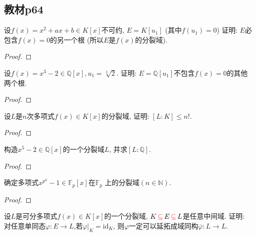 \subsection{教材p64}

\begin{problem}
    设$f(x) = x^2 + ax + b \in K[x]$不可约, $E = K[u_1]$
(其中$f(u_1) = 0$) 证明: $E$必包含$f(x) = 0$的另一个根
(所以$E$是$f(x)$的分裂域).
\end{problem}

\begin{proof}
    
\end{proof}

\begin{problem}
    设$f(x) = x^3 - 2 \in \mathbb{Q}[x], u_1 = \sqrt[3]{2}$.
证明: $E = \mathbb{Q}[u_1]$不包含$f(x) = 0$的其他两个根.
\end{problem}

\begin{proof}
    
\end{proof}

\begin{problem}
    设$L$是$n$次多项式$f(x) \in K[x]$的分裂域, 证明: 
$[L:K] \leqslant n!$.
\end{problem}

\begin{proof}
    
\end{proof}

\begin{problem}
    构造$x^5 - 2 \in \mathbb{Q}[x]$的一个分裂域$L$,
并求$[L:\mathbb{Q}]$.
\end{problem}

\begin{proof}
    
\end{proof}

\begin{problem}
    确定多项式$x^{p^n} - 1 \in \mathbb{F}_p[x]$在$\mathbb{F}_p$
上的分裂域$(n \in \mathbb{N})$.
\end{problem}

\begin{proof}
    
\end{proof}

\begin{problem}
    设$L$是可分多项式$f(x) \in K[x]$的一个分裂域, $K \,\textcolor{red}{\subseteq}\, E \,\textcolor{red}{\subseteq}\, L$是任意中间域.
证明: 对任意单同态$\varphi:E \to L$,若$\varphi|_K = \mathrm{id}_K$,
则$\varphi$一定可以延拓成域同构$\overline\varphi:L \to L$.
\end{problem}

